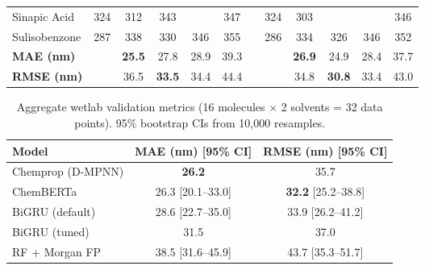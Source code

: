 \documentclass[11pt,a4paper]{article}
\newcommand{\gp}[1]{\cellcolor{goodpred}{#1}}
\begin{document}
\begin{table}[t]
\begin{tabular}{lccccccccccc}
Sinapic Acid    & 324 & 312 & 343 & \gp{318} & 347 & & 324 & 303 & \gp{332} & \gp{314} & 346 \\
Sulisobenzone   & 287 & 338 & 330 & 346 & 355 & & 286 & 334 & 326 & 346 & 352 \\
\midrule
\textbf{MAE (nm)} & & \textbf{25.5} & 27.8 & 28.9 & 39.3 & & & \textbf{26.9} & 24.9 & 28.4 & 37.7 \\
\textbf{RMSE (nm)} & & 36.5 & \textbf{33.5} & 34.4 & 44.4 & & & 34.8 & \textbf{30.8} & 33.4 & 43.0 \\
\bottomrule
\end{tabular}
\end{table}

\begin{table}[t]
\centering
\caption{Aggregate wetlab validation metrics (16 molecules $\times$ 2 solvents = 32 data points). 95\% bootstrap CIs from 10,000 resamples.}
\label{tab:wetlab_summary}
\begin{tabular}{lcc}
\toprule
\textbf{Model} & \textbf{MAE (nm) [95\% CI]} & \textbf{RMSE (nm) [95\% CI]} \\
\midrule
Chemprop (D-MPNN) & \textbf{26.2}              & 35.7 \\
ChemBERTa         & 26.3 [20.1--33.0] & \textbf{32.2} [25.2--38.8] \\
BiGRU (default)   & 28.6 [22.7--35.0] & 33.9 [26.2--41.2] \\
BiGRU (tuned)     & 31.5 & 37.0 \\
RF + Morgan FP    & 38.5 [31.6--45.9]          & 43.7 [35.3--51.7] \\
\bottomrule
\end{tabular}
\end{table}
\end{document}
